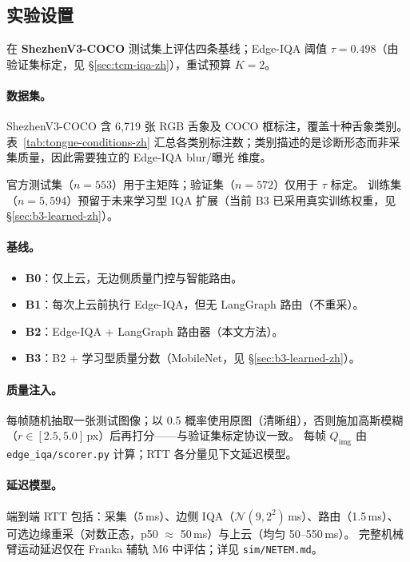 \subsection{实验设置}
\label{sec:setup-zh}

在 \textbf{ShezhenV3-COCO} 测试集上评估四条基线；Edge-IQA 阈值 $\tau{=}0.498$（由验证集标定，见 \S\ref{sec:tcm-iqa-zh}），重试预算 $K{=}2$。

\paragraph{数据集。}
ShezhenV3-COCO 含 6{,}719 张 RGB 舌象及 COCO 框标注，覆盖十种舌象类别。
表~\ref{tab:tongue-conditions-zh} 汇总各类别标注数；类别描述的是诊断形态而非采集质量，因此需要独立的 Edge-IQA blur/曝光 维度。

官方测试集（$n{=}553$）用于主矩阵；验证集（$n{=}572$）仅用于 $\tau$ 标定。
训练集（$n{=}5{,}594$）预留于未来学习型 IQA 扩展（当前 B3 已采用真实训练权重，见 \S\ref{sec:b3-learned-zh}）。

\paragraph{基线。}
\begin{itemize}
  \item \textbf{B0}：仅上云，无边侧质量门控与智能路由。
  \item \textbf{B1}：每次上云前执行 Edge-IQA，但无 LangGraph 路由（不重采）。
  \item \textbf{B2}：Edge-IQA + LangGraph 路由器（本文方法）。
  \item \textbf{B3}：B2 + 学习型质量分数（MobileNet，见 \S\ref{sec:b3-learned-zh}）。
\end{itemize}

\paragraph{质量注入。}
每帧随机抽取一张测试图像；以 0.5 概率使用原图（清晰组），否则施加高斯模糊（$r\in[2.5,5.0]$\,px）后再打分——与验证集标定协议一致。
每帧 $Q_{\mathrm{img}}$ 由 \texttt{edge\_iqa/scorer.py} 计算；RTT 各分量见下文延迟模型。

\paragraph{延迟模型。}
端到端 RTT 包括：采集（5\,ms）、边侧 IQA（$\mathcal{N}(9,2^2)$\,ms）、路由（1.5\,ms）、可选边缘重采（对数正态，p50 $\approx$ 50\,ms）与上云（均匀 50--550\,ms）。
完整机械臂运动延迟仅在 Franka 辅轨 M6 中评估；详见 \texttt{sim/NETEM.md}。

